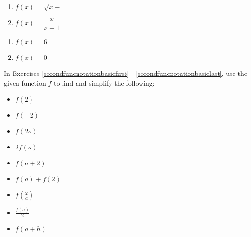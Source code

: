 \begin{multicols}{2}
\begin{enumerate}
\setcounter{enumi}{\value{HW}}

\item $f(x) = \sqrt{x-1}$
\item $f(x) = \dfrac{x}{x-1}$

\setcounter{HW}{\value{enumi}}
\end{enumerate}
\end{multicols}

\begin{multicols}{2}
\begin{enumerate}
\setcounter{enumi}{\value{HW}}

\item $f(x) = 6$
\item $f(x) = 0$ \label{funcnotationbasiclast}

\setcounter{HW}{\value{enumi}}
\end{enumerate}
\end{multicols}

\newpage

In Exercises \ref{secondfuncnotationbasicfirst} - \ref{secondfuncnotationbasiclast}, use the given function $f$ to find and simplify the following:

\begin{multicols}{3}
\begin{itemize}

\item  $f(2)$
\item  $f(-2)$
\item  $f(2a)$

\end{itemize}
\end{multicols}

\begin{multicols}{3}
\begin{itemize}

\item  $2 f(a)$
\item $f(a+2)$
\item $f(a) + f(2)$

\end{itemize}
\end{multicols}

\begin{multicols}{3}
\begin{itemize}

\item  $f \left( \frac{2}{a} \right)$
\item $\frac{f(a)}{2}$
\item  $f(a + h)$

\end{itemize}
\end{multicols}


